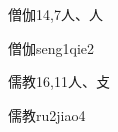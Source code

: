 \begin{entry}{僧伽}{14,7}{⼈、⼈}
  \begin{phonetics}{僧伽}{seng1qie2}
  \end{phonetics}
\end{entry}

\begin{entry}{儒教}{16,11}{⼈、⽁}
  \begin{phonetics}{儒教}{ru2jiao4}
  \end{phonetics}
\end{entry}


